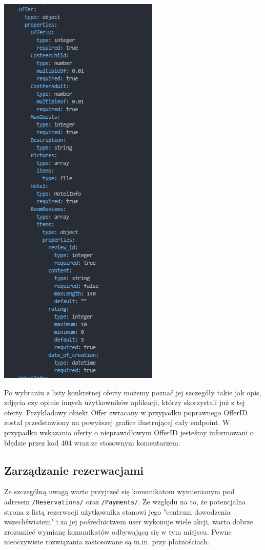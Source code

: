 \documentclass{article}
\begin{document}
\begin{center}
    \includegraphics[scale=1]{Oferta+Hotel-Raml/Offer_Raml.png}
\end{center}

Po wybraniu z listy konkretnej oferty możemy poznać jej szczegóły takie jak opis, zdjęcia czy opinie innych użytkowników aplikacji, którzy skorzystali już z tej oferty. Przykładowy obiekt Offer zwracany w przypadku poprawnego OfferID został przedstawiony na powyższej grafice ilustrującej cały endpoint. W przypadku wskazania oferty o nieprawidłowym OfferID jesteśmy informowani o błędzie przez kod 404 wraz ze stosownym komentarzem.

\subsection{Zarządzanie rezerwacjami}
Ze szczególną uwagą warto przyjrzeć się komunikatom wymienianym pod adresem \texttt{/Reservations/} oraz \texttt{/Payments/}. 
Ze względu na to, że potencjalna strona z listą rezerwacji użytkownika stanowi jego "centrum dowodzenia wszechświatem" i za jej pośrednictwem user wykonuje wiele akcji, warto dobrze zrozumieć wymianę komunikatów odbywającą się w tym miejscu. Pewne nieoczywiste rozwiązania zastosowane są m.in. przy płatnościach.
\end{document}
